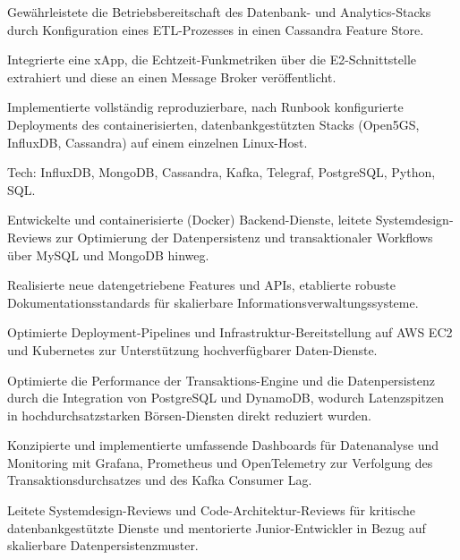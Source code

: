 \documentclass[10pt,a4paper]{resume}
\begin{document}
\bullets
  \item Gewährleistete die Betriebsbereitschaft des Datenbank- und Analytics-Stacks durch Konfiguration eines ETL-Prozesses in einen Cassandra Feature Store.
  \item Integrierte eine xApp, die Echtzeit-Funkmetriken über die E2-Schnittstelle extrahiert und diese an einen Message Broker veröffentlicht.
  \item Implementierte vollständig reproduzierbare, nach Runbook konfigurierte Deployments des containerisierten, datenbankgestützten Stacks (Open5GS, InfluxDB, Cassandra) auf einem einzelnen Linux-Host.
  \item Tech: InfluxDB, MongoDB, Cassandra, Kafka, Telegraf, PostgreSQL, Python, SQL.
\bulletsend
\vspace{1.5pt}
\bullets
  \item Entwickelte und containerisierte (Docker) Backend-Dienste, leitete Systemdesign-Reviews zur Optimierung der Datenpersistenz und transaktionaler Workflows über MySQL und MongoDB hinweg.
  \item Realisierte neue datengetriebene Features und APIs, etablierte robuste Dokumentationsstandards für skalierbare Informationsverwaltungssysteme.
  \item Optimierte Deployment-Pipelines und Infrastruktur-Bereitstellung auf AWS EC2 und Kubernetes zur Unterstützung hochverfügbarer Daten-Dienste.
\bulletsend
\vspace{1.5pt}
\bullets
  \item Optimierte die Performance der Transaktions-Engine und die Datenpersistenz durch die Integration von PostgreSQL und DynamoDB, wodurch Latenzspitzen in hochdurchsatzstarken Börsen-Diensten direkt reduziert wurden.
  \item Konzipierte und implementierte umfassende Dashboards für Datenanalyse und Monitoring mit Grafana, Prometheus und OpenTelemetry zur Verfolgung des Transaktionsdurchsatzes und des Kafka Consumer Lag.
  \item Leitete Systemdesign-Reviews und Code-Architektur-Reviews für kritische datenbankgestützte Dienste und mentorierte Junior-Entwickler in Bezug auf skalierbare Datenpersistenzmuster.
\bulletsend
\vspace{1.5pt}
\end{document}
